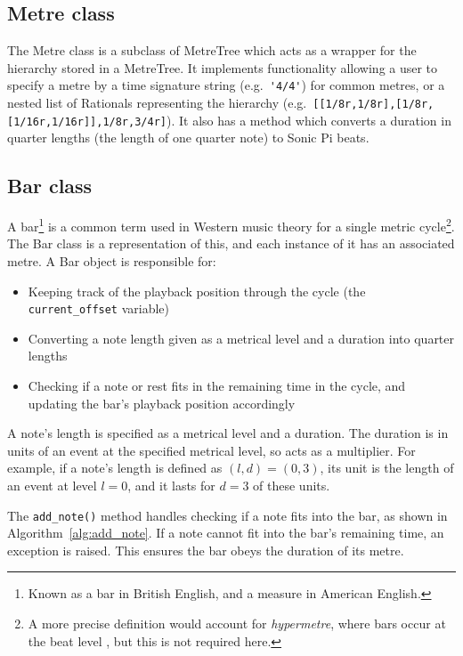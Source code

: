 \documentclass[12pt,twoside,openright]{report}
\begin{document}
\subsection{Metre class} \label{metre_class}

The Metre class is a subclass of MetreTree which acts as a wrapper for the
hierarchy stored in a MetreTree. It implements functionality allowing a user to
specify a metre by a time signature string (e.g.\ \verb|'4/4'|) for common metres, or a
nested list of Rationals representing the hierarchy (e.g.\ \verb'[[1/8r,1/8r],[1/8r,[1/16r,1/16r]],1/8r,3/4r]'). It also has a method which
converts a duration in quarter lengths (the length of one quarter note) to Sonic
Pi beats.


\subsection{Bar class} \label{bar_class}

A bar\footnote{Known as a bar in British English, and a measure in American English.} is a common term used in Western music theory for a single
metric cycle\footnote{A more precise definition would account for \emph{hypermetre}, where bars occur at the beat level \cite{neal2000}, but this is not required here.}. The Bar class is a representation of this, and each instance of it
has an associated metre. A Bar object is responsible for:
\begin{itemize}
	\item Keeping track of the playback position through the cycle (the \verb'current_offset' variable)
	\item Converting a note length given as a metrical level and a duration into
quarter lengths
	\item Checking if a note or rest fits in the remaining time in the cycle, and
updating the bar's playback position accordingly
\end{itemize}

A note's length is specified as a metrical level and a duration. The duration
is in units of an event at the specified metrical level, so acts as a multiplier.
For example, if a note's length is defined as $(l,d)=(0,3)$, its unit is the length of an event at level $l=0$, and it lasts for $d=3$ of these units.

The \verb'add_note()' method handles checking if a note fits into the bar, as shown in
Algorithm~\ref{alg:add_note}. If a note cannot fit into the bar's remaining time,
an exception is raised. This ensures the bar obeys the duration of its metre.
\end{document}
